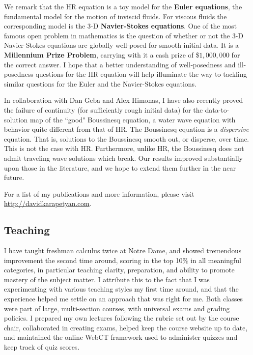 \documentclass[12pt,reqno]{article}
\begin{document}
We remark that the HR equation is a toy model for the \textbf{Euler equations},
the fundamental model for the motion of inviscid fluids.
For  viscous  fluids the corresponding model is  the  3-D {\bf Navier-Stokes equations}.  
One of the most famous open problem in mathematics is the question of whether or not the 3-D Navier-Stokes equations are globally well-posed for smooth initial data. It is a \textbf{Millennium Prize Problem}, carrying with it a cash prize of \$$1,000,000$ for the correct answer. I hope that a better understanding of well-posedness and ill-posedness questions for the HR equation will help illuminate the way to tackling similar questions for the Euler and the Navier-Stokes equations. 


In collaboration with Dan Geba and Alex Himonas, I have also recently proved
the failure of continuity (for sufficiently rough initial data) for the
data-to-solution map of the ``good" Boussinesq equation, a water wave equation
with behavior quite different from that of HR\@. The Boussinesq equation is a
\textit{dispersive} equation. That is, solutions to the Boussinesq smooth
out, or disperse, over time. This is not the case with HR\@. Furthermore, unlike
HR, the Boussinesq does not admit traveling wave solutions which break. Our
results improved substantially upon those in the literature, and we hope to
extend them further in the near future. 

For a list of my publications and more information, please visit \href{http://davidkarapetyan.com}{http://davidkarapetyan.com}.
\subsection{Teaching} 
\label{ssec:teaching}
I have taught freshman calculus twice at Notre
Dame, and showed tremendous improvement the second time around, scoring in the
top 10\% in all meaningful categories, in particular teaching clarity,
preparation, and ability to promote mastery of the subject matter. I attribute
this to the fact that I was experimenting with various
teaching styles my first time around, and that the experience helped me settle
on an approach that was right for me. Both classes were part of large,
multi-section courses, with universal exams and grading policies. I prepared my
own lectures following the rubric set out by the course chair, collaborated in
creating exams, helped keep the course website up to date, and maintained the
online WebCT framework used to administer quizzes and keep track of quiz scores.
\end{document}
